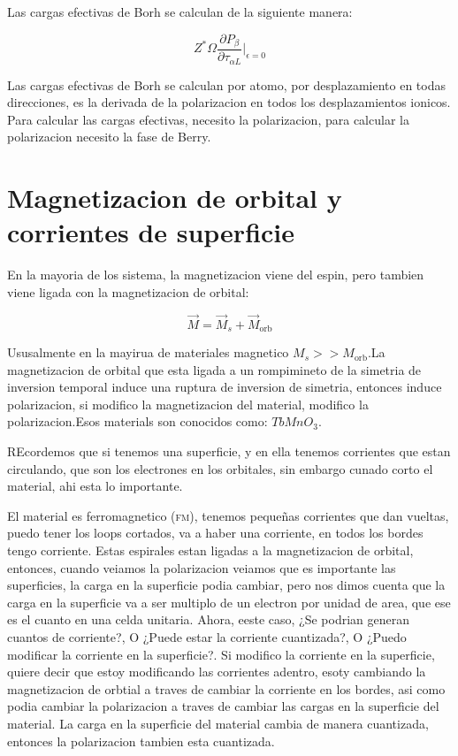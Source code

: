 \documentclass[11pt,fleqn]{book}
\begin{document}
Las cargas efectivas de Borh se calculan de la siguiente manera: 

\begin{equation}
    Z^{\ast}\Omega\frac{\partial P_{\beta}}{\partial\tau_{\alpha L}}|_{\epsilon=0}
\end{equation}

Las cargas efectivas de Borh se calculan por atomo, por desplazamiento en todas direcciones, es la derivada de la polarizacion en todos los desplazamientos ionicos. Para calcular las cargas efectivas, necesito la polarizacion, para calcular la polarizacion necesito la fase de Berry.

\section{Magnetizacion de orbital y corrientes de superficie}

En la mayoria de los sistema, la magnetizacion viene del espin, pero tambien viene ligada con la magnetizacion de orbital:

\begin{equation}
    \vec{M}=\vec{M}_{s}+\vec{M}_{\text{orb}}
\end{equation}

Ususalmente en la mayirua de materiales magnetico $M_{s}>>M_{\text{orb}}$.La magnetizacion de orbital que esta ligada a un rompimineto de la simetria de inversion temporal induce una ruptura de inversion de simetria, entonces induce polarizacion, si modifico la magnetizacion del material, modifico la polarizacion.Esos materials son conocidos como: $TbMnO_{3}$.

REcordemos que si tenemos una superficie, y en ella tenemos corrientes que estan circulando, que son  los electrones en los orbitales, sin embargo cunado corto el material, ahi esta lo importante. 


El material es ferromagnetico (\textsc{fm}), tenemos pequeñas corrientes que dan vueltas,  puedo tener los loops cortados, va a haber una corriente, en todos los bordes tengo corriente. Estas espirales estan ligadas a la magnetizacion de orbital, entonces, cuando veiamos la polarizacion veiamos que es importante las superficies, la carga en la superficie podia cambiar, pero nos dimos cuenta que la carga en la superficie va a ser multiplo de un electron por unidad de area, que ese es el cuanto en una celda unitaria. Ahora, eeste caso, ¿Se podrian generan cuantos de corriente?, O ¿Puede estar la corriente cuantizada?, O ¿Puedo modificar  la corriente en la superficie?. Si modifico la corriente en la superficie, quiere decir que estoy modificando las corrientes adentro, esoty cambiando la magnetizacion de orbtial a traves de cambiar la corriente en los bordes, asi como podia cambiar la polarizacion a traves de cambiar las cargas en la superficie del material. La carga en la superficie del material cambia de manera  cuantizada, entonces la polarizacion tambien esta cuantizada.
\end{document}
